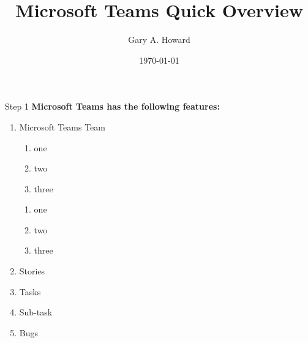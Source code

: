 \documentclass[compress, 10pt]{beamer}
\title{Microsoft Teams Quick Overview}
\date{\today}
\author{Gary A. Howard}
\begin{document}

\begin{frame}
\titlepage%
\end{frame}


\begin{frame}{Step 1}%
  \textbf{Microsoft Teams has the following features:}%
  \begin{enumerate}%
    \item Microsoft Teams Team%
      \begin{enumerate}%
        \item one
        \item two
        \item three
      \end{enumerate}%
      \begin{enumerate}%
        \item one
        \item two
        \item three
      \end{enumerate}%
    \item Stories%
    \item Tasks%
    \item Sub-task%
    \item Bugs%
  \end{enumerate}%
\end{frame}%

\end{document}
